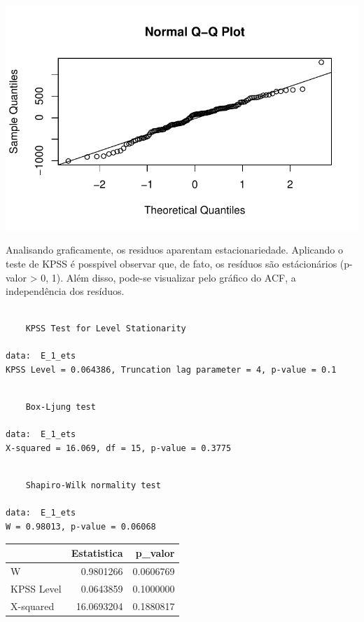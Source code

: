 \documentclass[
  letterpaper,
  DIV=11,
  numbers=noendperiod]{scrartcl}
\begin{document}
\includegraphics{T2_grupo10_files/figure-pdf/residuos-ets-sem-transform-2.pdf}

Analisando graficamente, os residuos aparentam estacionariedade.
Aplicando o teste de KPSS é posspivel observar que, de fato, os resíduos
são estácionários (p-valor \textgreater{} 0, 1). Além disso, pode-se
visualizar pelo gráfico do ACF, a independência dos resíduos.

\begin{verbatim}

    KPSS Test for Level Stationarity

data:  E_1_ets
KPSS Level = 0.064386, Truncation lag parameter = 4, p-value = 0.1
\end{verbatim}

\begin{verbatim}

    Box-Ljung test

data:  E_1_ets
X-squared = 16.069, df = 15, p-value = 0.3775
\end{verbatim}

\begin{verbatim}

    Shapiro-Wilk normality test

data:  E_1_ets
W = 0.98013, p-value = 0.06068
\end{verbatim}

\begin{tabular}{l|r|r}
\hline
  & Estatistica & p\_valor\\
\hline
W & 0.9801266 & 0.0606769\\
\hline
KPSS Level & 0.0643859 & 0.1000000\\
\hline
X-squared & 16.0693204 & 0.1880817\\
\hline
\end{tabular}
\end{document}
